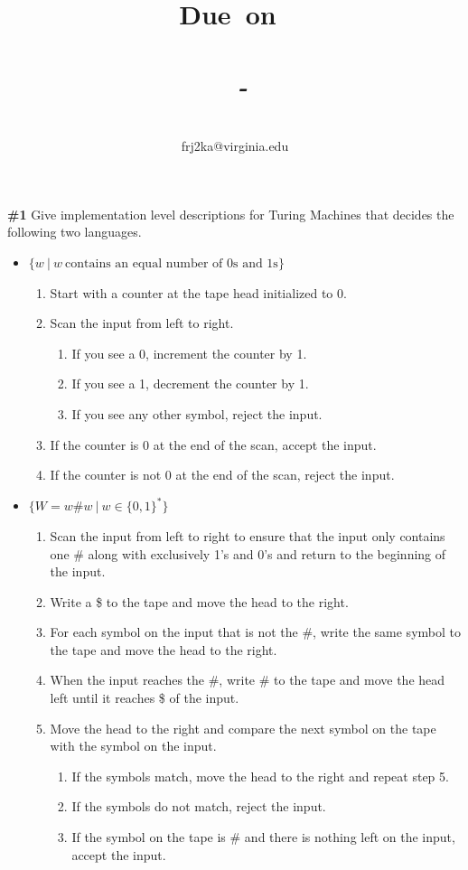 \documentclass{article}
\title{
    \vspace{2in}
    \textmd{\textbf{\hmwkTitle}}\\
    \normalsize\vspace{0.1in}
    \small{\textbf{Due\ on\ \hmwkDueDate}}\\
    \normalsize\text{Tuesday/Thursday 11:00-12:15, Warner 209}\\
    \vspace{0.1in}\large{\textit{\hmwkClassInstructor\ - \hmwkClassTime}}
    \vspace{3in}
}
\author{\hmwkAuthorName\\\small{frj2ka@virginia.edu}}
\date{}
\newcommand{\problem}[1]{\textbf{\##1}}
\newcommand{\prob}[1]{\problem{#1}}
\begin{document}
\maketitle

\pagebreak

\prob{1} Give implementation level descriptions for Turing Machines that decides the following two languages.

\begin{itemize}
	\item $\{w \ | \ w \ \text{contains an equal number of 0s and 1s} \}$

    \begin{enumerate}
        \item Start with a counter at the tape head initialized to 0.
        \item Scan the input from left to right.
        \begin{enumerate}
            \item If you see a 0, increment the counter by 1.
            \item If you see a 1, decrement the counter by 1.
            \item If you see any other symbol, reject the input.
        \end{enumerate}
        \item If the counter is 0 at the end of the scan, accept the input.
        \item If the counter is not 0 at the end of the scan, reject the input.
    \end{enumerate}

	\item $\{W = w\#w \ | \ w \in \{0,1\}^* \}$
	
    \begin{enumerate}
        \item Scan the input from left to right to ensure that the input only contains one \# along with exclusively 1's and 0's and return to the beginning of the input.
        \item Write a \$ to the tape and move the head to the right.
        \item For each symbol on the input that is not the \#, write the same symbol to the tape and move the head to the right.
        \item When the input reaches the \#, write \# to the tape and move the head left until it reaches \$ of the input.
        \item Move the head to the right and compare the next symbol on the tape with the symbol on the input.
        \begin{enumerate}
            \item If the symbols match, move the head to the right and repeat step 5.
            \item If the symbols do not match, reject the input.
            \item If the symbol on the tape is \# and there is nothing left on the input, accept the input. 
        \end{enumerate}
    \end{enumerate}

\end{itemize}
\end{document}
